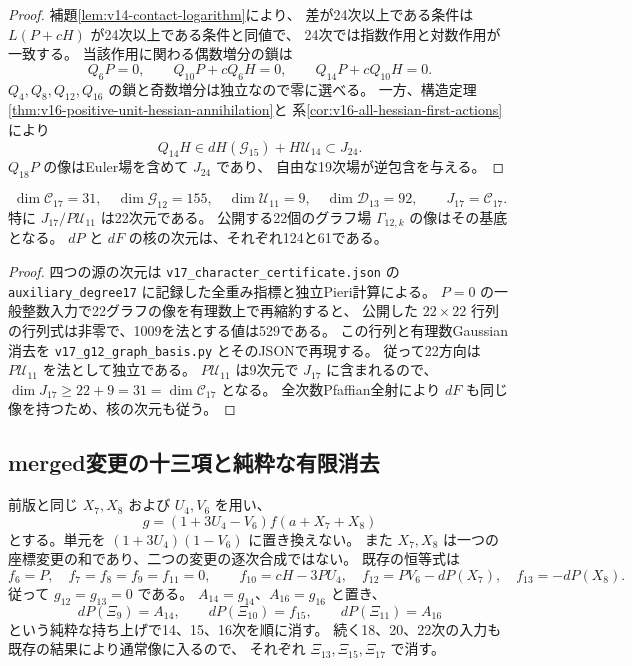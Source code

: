 \begin{proof}
補題\ref{lem:v14-contact-logarithm}により、
差が24次以上である条件は $L(P+cH)$ が24次以上である条件と同値で、
24次では指数作用と対数作用が一致する。
当該作用に関わる偶数増分の鎖は
\[
 Q_6P=0,\qquad Q_{10}P+cQ_6H=0,\qquad
 Q_{14}P+cQ_{10}H=0.
\]
$Q_4,Q_8,Q_{12},Q_{16}$ の鎖と奇数増分は独立なので零に選べる。
一方、構造定理\ref{thm:v16-positive-unit-hessian-annihilation}と
系\ref{cor:v16-all-hessian-first-actions}により
\[
 Q_{14}H\in dH(\mathcal G_{15})+H\mathcal U_{14}\subset J_{24}.
\]
$Q_{18}P$ の像はEuler場を含めて $J_{24}$ であり、
自由な19次場が逆包含を与える。
\end{proof}

\begin{proposition}[十七次通常像と二十二個の代表場]
\label{prop:v17-seventeenth-contact-basis}
\[
 \dim\mathcal C_{17}=31,\quad
 \dim\mathcal G_{12}=155,\quad
 \dim\mathcal U_{11}=9,\quad
 \dim\mathcal D_{13}=92,\qquad
                           J_{17}=\mathcal C_{17}.
\]
特に $J_{17}/P\mathcal U_{11}$ は22次元である。
公開する22個のグラフ場 $\Gamma_{12,k}$ の像はその基底となる。
$dP$ と $dF$ の核の次元は、それぞれ124と61である。
\end{proposition}

\begin{proof}
四つの源の次元は
\nolinkurl{v17_character_certificate.json} の
\texttt{auxiliary\_degree17} に記録した全重み指標と独立Pieri計算による。
$P=0$ の一般整数入力で22グラフの像を有理数上で再縮約すると、
公開した $22\times22$ 行列の行列式は非零で、1009を法とする値は529である。
この行列と有理数Gaussian消去を
\nolinkurl{v17_g12_graph_basis.py} とそのJSONで再現する。
従って22方向は $P\mathcal U_{11}$ を法として独立である。
$P\mathcal U_{11}$ は9次元で $J_{17}$ に含まれるので、
$\dim J_{17}\ge22+9=31=\dim\mathcal C_{17}$ となる。
全次数Pfaffian全射により $dF$ も同じ像を持つため、核の次元も従う。
\end{proof}

\subsection{merged変更の十三項と純粋な有限消去}

前版と同じ $X_7,X_8$ および $U_4,V_6$ を用い、
\[
               g=(1+3U_4-V_6)f(a+X_7+X_8)
\]
とする。単元を $(1+3U_4)(1-V_6)$ に置き換えない。
また $X_7,X_8$ は一つの座標変更の和であり、二つの変更の逐次合成ではない。
既存の恒等式は
\[
 f_6=P,\quad f_7=f_8=f_9=f_{11}=0,\qquad
 f_{10}=cH-3PU_4,\quad f_{12}=PV_6-dP(X_7),\quad f_{13}=-dP(X_8).
\]
従って $g_{12}=g_{13}=0$ である。
$A_{14}=g_{14}$、$A_{16}=g_{16}$ と置き、
\[
 dP(\Xi_9)=A_{14},\qquad dP(\Xi_{10})=f_{15},\qquad
 dP(\Xi_{11})=A_{16}
\]
という純粋な持ち上げで14、15、16次を順に消す。
続く18、20、22次の入力も既存の結果により通常像に入るので、
それぞれ $\Xi_{13},\Xi_{15},\Xi_{17}$ で消す。

